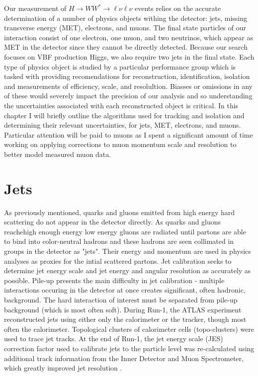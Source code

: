 Our measurement of $H\rightarrow WW^*\rightarrow \ell\nu\ell\nu$ events relies on the accurate determination of a number of physics objects withing the detector: jets, missing transverse energy (MET), electrons, and muons. The final state particles of our interaction consist of one electron, one muon, and two neutrinos, which appear as MET in the detector since they cannot be directly detected. Because our search focuses on VBF production Higgs, we also require two jets in the final state. Each type of physics object is studied by a particular performance group which is tasked with providing recomendations for reconstruction, identification, isolation and measurements of efficiency, scale, and resolultion. Biasses or omissions in any of these would severely impact the precision of our analysis and so understanding the uncertainties associated with each reconstructed object is critical. In this chapter I will briefly outline the algorithms used for tracking and isolation and determining their relevant uncertainties, for jets, MET, electrons, and muons. Particular attention will be paid to muons as I spent a significant amount of time working on applying corrections to muon momentum scale and resolution to better model measured muon data. 
\section{Jets}
As previously mentioned, quarks and gluons emitted from high energy hard scattering do not appear in the detector directly. As quarks and gluons reachehigh enough energy low energy gluons are radiated until partons are able to bind into color-neutral hadrons and these hadrons are seen collimated in groups in the detector as "jets". Their energy and momentum are used in physics analyses as proxies for the intial scattered partons. Jet calibration seeks to determine jet energy scale and jet energy and angular resolution as accurately as possible. Pile-up presents the main difficulty in jet calibration - multiple interactions occuring in the detector at once creates significant, often hadronic, background. The hard interaction of interest must be separated from pile-up background (which is most often soft). During Run-1, the ATLAS experiment reconstructed jets using either only the calorimeter or the tracker, though most often the calorimeter. Topological clusters of calorimeter cells (topo-clusters) were used to trace jet tracks. At the end of Run-1, the jet energy scale (JES) correction factor used to calibrate jets to the particle level was re-calculated using additional track information from the Inner Detector and Muon Spectrometer, which greatly improved jet resolution \cite{JetRun1}. 

